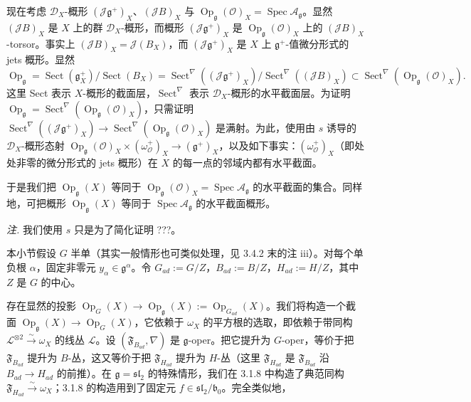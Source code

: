 现在考虑 $\mathcal{D}_{X}$-概形 $(\mathcal{J}\mathfrak{g}^{+})_{X}$、$(\mathcal{J}B)_{X}$ 与 $\operatorname{Op}_{\mathfrak{g}}(\mathcal{O})_{X}=\operatorname{Spec}\mathcal{A}_{\mathfrak{g}}$。显然 $(\mathcal{J}B)_{X}$ 是 $X$ 上的群 $\mathcal{D}_{X}$-概形，而概形 $(\mathcal{J}\mathfrak{g}^{+})_{X}$ 是 $\operatorname{Op}_{\mathfrak{g}}(\mathcal{O})_{X}$ 上的 $(\mathcal{J}B)_{X}$-torsor。事实上 $(\mathcal{J}B)_{X}=\mathcal{J}(B_{X})$，而 $(\mathcal{J}\mathfrak{g}^{+})_{X}$ 是 $X$ 上 $\mathfrak{g}^{+}$-值微分形式的 jets 概形。显然
\[
  \operatorname{Op}_{\mathfrak{g}}=\operatorname{Sect}(\mathfrak{g}_{X}^{+})/\operatorname{Sect}(B_{X})
  =\operatorname{Sect}^{\nabla}((\mathcal{J}\mathfrak{g}^{+})_{X})/\operatorname{Sect}^{\nabla}((\mathcal{J}B)_{X})
  \subset\operatorname{Sect}^{\nabla}(\operatorname{Op}_{\mathfrak{g}}(\mathcal{O})_{X}).
\]
这里 Sect 表示 $X$-概形的截面层，$\operatorname{Sect}^{\nabla}$ 表示 $\mathcal{D}_{X}$-概形的水平截面层。为证明 $\operatorname{Op}_{\mathfrak{g}}=\operatorname{Sect}^{\nabla}(\operatorname{Op}_{\mathfrak{g}}(\mathcal{O})_{X})$，只需证明 $\operatorname{Sect}^{\nabla}((\mathcal{J}\mathfrak{g}^{+})_{X})\to\operatorname{Sect}^{\nabla}(\operatorname{Op}_{\mathfrak{g}}(\mathcal{O})_{X})$ 是满射。为此，使用由 $s$ 诱导的 $\mathcal{D}_{X}$-概形态射 $\operatorname{Op}_{\mathfrak{g}}(\mathcal{O})_{X}\times(\omega_{\mathcal{O}}^{+})_{X}\to(\mathfrak{g}^{+})_{X}$，以及如下事实：$(\omega_{\mathcal{O}}^{+})_{X}$（即处处非零的微分形式的 jets 概形）在 $X$ 的每一点的邻域内都有水平截面。

于是我们把 $\operatorname{Op}_{\mathfrak{g}}(X)$ 等同于 $\operatorname{Op}_{\mathfrak{g}}(\mathcal{O})_{X}=\operatorname{Spec}\mathcal{A}_{\mathfrak{g}}$ 的水平截面的集合。同样地，可把概形 $\operatorname{Op}_{\mathfrak{g}}(X)$ 等同于 $\operatorname{Spec}\mathcal{A}_{\mathfrak{g}}$ 的水平截面概形。

\emph{注.} 我们使用 $s$ 只是为了简化证明 ???。

本小节假设 $G$ 半单（其实一般情形也可类似处理，见 3.4.2 末的注 iii）。对每个单负根 $\alpha$，固定非零元 $y_{\alpha}\in\mathfrak{g}^{\alpha}$。令 $G_{ad}:=G/Z$，$B_{ad}:=B/Z$，$H_{ad}:=H/Z$，其中 $Z$ 是 $G$ 的中心。

 存在显然的投影 $\operatorname{Op}_{G}(X)\longrightarrow\operatorname{Op}_{\mathfrak{g}}(X):=\operatorname{Op}_{G_{ad}}(X)$。我们将构造一个截面 $\operatorname{Op}_{\mathfrak{g}}(X)\to\operatorname{Op}_{G}(X)$，它依赖于 $\omega_{X}$ 的平方根的选取，即依赖于带同构 $\mathcal{L}^{\otimes 2}\xrightarrow{\sim}\omega_{X}$ 的线丛 $\mathcal{L}$。设 $(\mathfrak{F}_{B_{ad}},\nabla)$ 是 $\mathfrak{g}$-oper。把它提升为 $G$-oper，等价于把 $\mathfrak{F}_{B_{ad}}$ 提升为 $B$-丛，这又等价于把 $\mathfrak{F}_{H_{ad}}$ 提升为 $H$-丛（这里 $\mathfrak{F}_{H_{ad}}$ 是 $\mathfrak{F}_{B_{ad}}$ 沿 $B_{ad}\to H_{ad}$ 的前推）。在 $\mathfrak{g}=\mathfrak{sl}_{2}$ 的特殊情形，我们在 3.1.8 中构造了典范同构 $\mathfrak{F}_{H_{ad}}\xrightarrow{\sim}\omega_{X}$；3.1.8 的构造用到了固定元 $f\in\mathfrak{sl}_{2}/\mathfrak{b}_{0}$。完全类似地，

